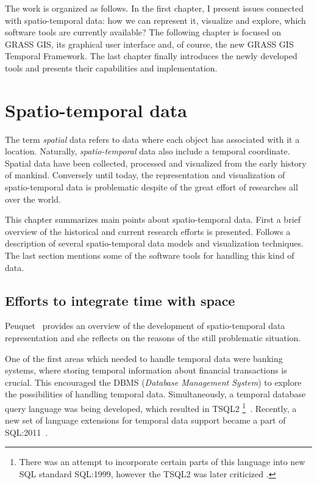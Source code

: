 \documentclass[a4paper,12pt,oneside]{book}
\newcommand{\tf}{Temporal Framework\xspace}
\begin{document}
The work is organized as follows. In the first chapter, I present issues connected with spatio-temporal data:
how we can represent it, visualize and explore, which software tools are currently available?
The following chapter is focused on GRASS GIS, its graphical user interface and, of course,
the new GRASS GIS \tf.
The last chapter finally introduces the newly developed tools and presents their capabilities and implementation.







\chapter{Spatio-temporal data}
\label{chap:stdata}
The term \emph{spatial} data refers to data where each object has associated with it a location.
Naturally, \emph{spatio-temporal} data also include a temporal coordinate.
Spatial data have been collected, processed and visualized from the early history of mankind.
Conversely until today, the representation and visualization of spatio-temporal data
is problematic despite of the great effort of researches all over the world.

This chapter summarizes main points about spatio-temporal data.
First a brief overview of the historical and current research efforts is presented.
Follows a description of several spatio-temporal data models and visualization techniques.
The last section mentions some of the software tools for handling this kind of data.


\section{Efforts to integrate time with space}
Peuquet~\cite{peuquet2001} provides an overview of the development of spatio-temporal data representation
and she reflects on the reasons of the still problematic situation.

One of the first areas which needed to handle temporal data were banking systems,
where storing temporal information about financial transactions is crucial.
This encouraged the DBMS (\emph{Database Management System}) to explore the possibilities of handling
temporal data. Simultaneously, a temporal database query language was being developed,
which resulted in TSQL2%
\footnote{There was an attempt to incorporate certain parts of this language
into new SQL standard SQL:1999, however the TSQL2 was later criticized
\cite{darwen2005}.}~\cite{snodgrass1995}.
Recently, a new set of language extensions for temporal data support became a part of
SQL:2011~\cite{kulkarni2012}.
\end{document}
